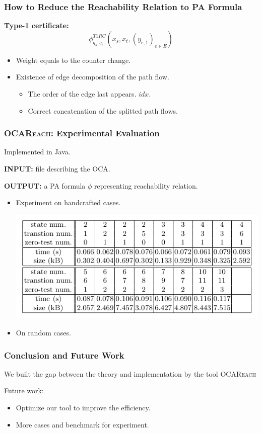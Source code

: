 \documentclass[11pt]{beamer}
\begin{document}
\begin{frame}\frametitle{How to Reduce the Reachability Relation to PA Formula}

\textbf{Type-1 certificate:}
\[\phi^{T1RC}_{q_s, q_t}(x_s, x_t, (y_{e,1})_{e\in E}) \]
\begin{itemize}
\item Weight equals to the counter change.
\pause
\item Existence of edge decomposition of the path flow.
\pause
\begin{itemize}
\item The order of the edge last appears. $idx$.
\pause
\item Correct concatenation of the splitted path flows.
\end{itemize}
\end{itemize}
\end{frame}


\begin{frame}\frametitle{\textsc{OCAReach}: Experimental Evaluation}
Implemented in Java.

\textbf{INPUT:} file describing the OCA.

\textbf{OUTPUT:} a PA formula $\phi$ representing reachability relation.
\begin{itemize}
\item Experiment on handcrafted cases.
\begin{center}
\includegraphics[scale=0.4]{expoca.png}
\end{center}
\item On random cases.
\end{itemize}
\end{frame}

\begin{frame}\frametitle{Conclusion and Future Work}
We built the gap between the theory and implementation by the tool \textsc{OCAReach}

Future work:

\begin{itemize}
\item Optimize our tool to improve the efficiency.

\item More cases and benchmark for experiment.
\end{itemize}
\end{frame}
\end{document}
